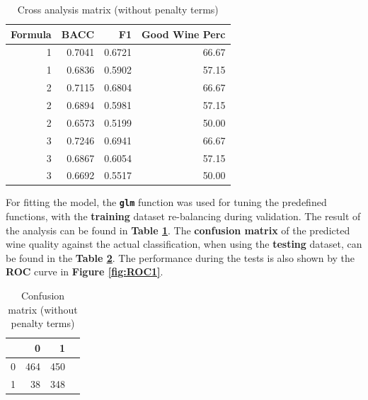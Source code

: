 \documentclass[a4paperpaper,9pt,twocolumn,twoside,printwatermark=false]{pinp}
\begin{document}
\begin{table}[ht]
\begin{center}
\begin{tabular}{r|rrr}
\hline
Formula & BACC & F1 & Good Wine Perc \\
\hline
1 & 0.7041 & 0.6721 & 66.67 \\
1 & 0.6836 & 0.5902 & 57.15 \\
2 & 0.7115 & 0.6804 & 66.67 \\
2 & 0.6894 & 0.5981 & 57.15 \\
2 & 0.6573 & 0.5199 & 50.00 \\
3 & 0.7246 & 0.6941 & 66.67 \\
3 & 0.6867 & 0.6054 & 57.15 \\
3 & 0.6692 & 0.5517 & 50.00 \\
\hline
\end{tabular}
\caption{\label{tab:CrossAnalysis}Cross analysis matrix (without penalty terms)}
\end{center}
\end{table}

For fitting the model, the \textbf{\texttt{glm}} function was used for
tuning the predefined functions, with the \textbf{training} dataset
re-balancing during validation. The result of the analysis can be found
in \textbf{Table \ref{tab:CrossAnalysis}}. The \textbf{confusion matrix}
of the predicted wine quality against the actual classification, when
using the \textbf{testing} dataset, can be found in the \textbf{Table
\ref{tab:ConfusionMatrix}}. The performance during the tests is also
shown by the \textbf{ROC} curve in \textbf{Figure \ref{fig:ROC1}}.

\begin{table}[ht]
\begin{center}
\begin{tabular}{rrrr}
\hline
 & 0 & 1 \\
\hline
0 & 464 & 450 \\
1 & 38 & 348 \\
\hline
\end{tabular}
\caption{\label{tab:ConfusionMatrix}Confusion matrix (without penalty terms)}
\end{center}
\end{table}
\end{document}
